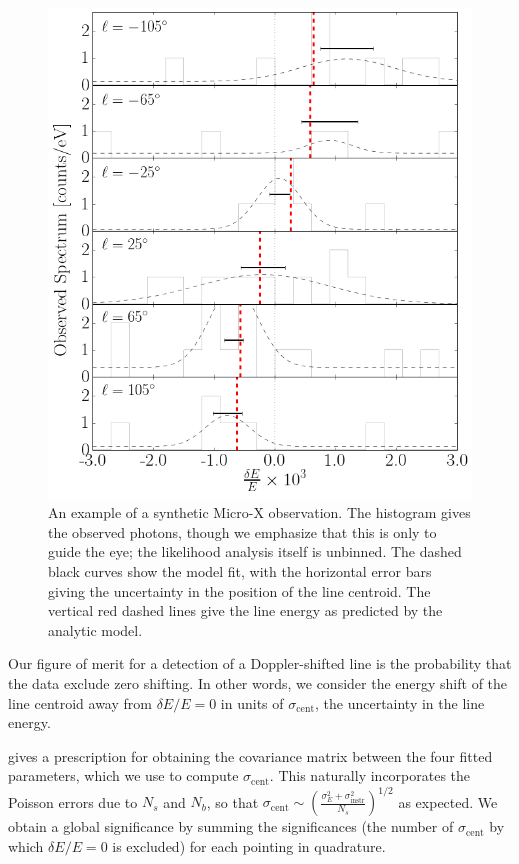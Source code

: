 \documentclass[aps,prd,10pt,twocolumn,superscriptaddress,showpacs]{revtex4-1}
\begin{document}
\begin{figure}[h!]
\centering
\includegraphics[width=1.0\columnwidth]{example_obs.png}
\caption{ An example of a synthetic Micro-X observation. The histogram gives the observed photons,
	though we emphasize that this is only to guide the eye; the likelihood analysis itself is
	unbinned. The dashed black curves show the model fit, with the horizontal error bars giving the
	uncertainty in the position of the line centroid. The vertical red dashed lines give the line
	energy as predicted by the analytic model.
}
\label{fig:synobs}
\end{figure}



Our figure of merit for a detection of a Doppler-shifted line is the probability that the data
exclude zero shifting. In other words, we consider the energy shift of the line centroid
away from $\delta E/E=0$ in units of $\sigma_\mathrm{cent}$, the uncertainty in the line energy.

\cite{barlow1990} gives a prescription for obtaining the covariance matrix between the four fitted
parameters, which we use to compute $\sigma_\mathrm{cent}$. This naturally incorporates the Poisson errors due to
$N_s$ and $N_b$, so that $\sigma_\mathrm{cent} \sim \left(\frac{\sigma_E^2+\sigma_\mathrm{instr}^2
}{N_s}\right)^{1/2}$ as expected. 
We obtain a global significance by summing the significances (the
number of $\sigma_\mathrm{cent}$ by which $\delta E/E=0$ is excluded) for each
pointing in quadrature.
\end{document}
